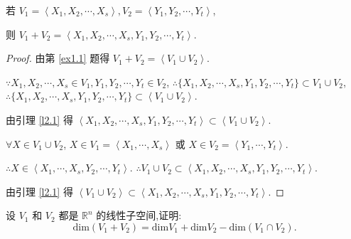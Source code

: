 \documentclass[color=black,device=normal,lang=cn,mode=geye]{elegantnote}
\begin{document}
\begin{lemma}\label{l2.2}
    若 $V_1=\left<X_1,X_2,\cdots,X_s\right>,V_2=\left<Y_1,Y_2,\cdots,Y_t\right>$,
    
    则 $V_1+V_2=\left<X_1,X_2,\cdots,X_s,Y_1,Y_2,\cdots,Y_t\right>$.
\end{lemma}
\begin{proof}
    由第 \ref{ex1.1} 题得 $V_1+V_2=\left<V_1\cup V_2\right>$.

    $\because X_1,X_2,\cdots,X_s\in V_1,Y_1,Y_2,\cdots,Y_t\in V_2$, $\therefore\{X_1,X_2,\cdots,X_s,Y_1,Y_2,\cdots,Y_t\}\subset V_1\cup V_2$, $\therefore\{X_1,X_2,\cdots,X_s,Y_1,Y_2,\cdots,Y_t\}\subset\left<V_1\cup V_2\right>$.
    
    由引理 \ref{l2.1} 得 $\left<X_1,X_2,\cdots,X_s,Y_1,Y_2,\cdots,Y_t\right>\subset\left<V_1\cup V_2\right>$.

    $\forall X\in V_1\cup V_2$, $X\in V_1=\left<X_1,\cdots,X_s\right>$ 或 $X\in V_2=\left<Y_1,\cdots,Y_t\right>$.
    
    $\therefore X\in\left<X_1,\cdots,X_s,Y_2,\cdots,Y_t\right>$. $\therefore V_1\cup V_2\subset\left<X_1,X_2,\cdots,X_s,Y_1,Y_2,\cdots,Y_t\right>$.
    
    由引理 \ref{l2.1} 得 $\left<V_1\cup V_2\right>\subset\left<X_1,X_2,\cdots,X_s,Y_1,Y_2,\cdots,Y_t\right>$.
\end{proof}
\begin{exercise}[有改动]\label{ex1.7}
设 $V_1$ 和 $V_2$ 都是 $\mathbb{R}^n$ 的线性子空间,证明:
$$\mathrm{dim}(V_1+V_2)=\mathrm{dim}V_1+\mathrm{dim}V_2-\mathrm{dim}(V_1\cap V_2).$$
\end{exercise}
\end{document}
